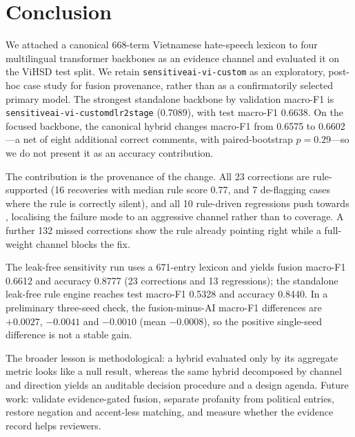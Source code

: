 \section{Conclusion}
\label{sec:conclusion}

We attached a canonical 668-term Vietnamese hate-speech lexicon to four
multilingual transformer backbones as an evidence channel and evaluated it on
the ViHSD test split. We retain \texttt{sensitiveai-vi-custom} as an
exploratory, post-hoc case study for fusion provenance, rather than as a
confirmatorily selected primary model. The strongest standalone backbone by
validation macro-F1 is \texttt{sensitiveai-vi-customdlr2stage} (0.7089), with
test macro-F1 0.6638. On the focused backbone, the canonical hybrid changes
macro-F1 from 0.6575 to 0.6602---a net of eight additional correct comments,
with paired-bootstrap $p=0.29$---so we do not present it as an accuracy
contribution.

The contribution is the provenance of the change. All 23 corrections are
rule-supported (16 \hate{} recoveries with median rule score 0.77, and 7
\clean{} de-flagging cases where the rule is correctly silent), and all 10
rule-driven regressions push towards \hate{}, localising the failure mode to an
aggressive channel rather than to coverage. A further 132 missed corrections
show the rule already pointing right while a full-weight \clean{} channel
blocks the fix.

The leak-free sensitivity run uses a 671-entry lexicon and yields fusion
macro-F1 0.6612 and accuracy 0.8777 (23 corrections and 13 regressions); the
standalone leak-free rule engine reaches test macro-F1 0.5328 and accuracy
0.8440. In a preliminary three-seed check, the fusion-minus-AI macro-F1
differences are $+0.0027$, $-0.0041$ and $-0.0010$ (mean $-0.0008$), so the
positive single-seed difference is not a stable gain.

The broader lesson is methodological: a hybrid evaluated only by its aggregate
metric looks like a null result, whereas the same hybrid decomposed by channel
and direction yields an auditable decision procedure and a design agenda.
Future work: validate evidence-gated fusion, separate profanity from political
entries, restore negation and accent-less matching, and measure whether the
evidence record helps reviewers.